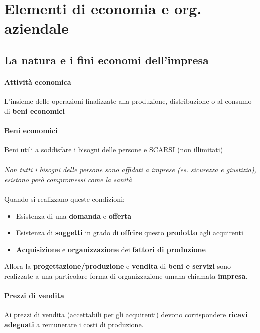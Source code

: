 \documentclass[12pt]{article}
\begin{document}
\section{Elementi di economia e org. aziendale}
\subsection{La natura e i fini economi dell'impresa}
\paragraph{Attività economica} L'insieme delle operazioni finalizzate alla produzione, distribuzione o al consumo di \textbf{beni economici}
\paragraph{Beni economici} Beni utili a soddisfare i bisogni delle persone e SCARSI (non illimitati)

\paragraph{}\textit{Non tutti i bisogni delle persone sono affidati a imprese (es. sicurezza e giustizia), esistono però compromessi come la sanità}

\paragraph{} Quando si realizzano queste condizioni:
\begin{itemize}
    \item Esistenza di una \textbf{domanda} e \textbf{offerta}
    \item Esistenza di \textbf{soggetti} in grado di \textbf{offrire} questo \textbf{prodotto} agli acquirenti
    \item \textbf{Acquisizione} e \textbf{organizzazione} dei \textbf{fattori di produzione}
\end{itemize}
Allora la \textbf{progettazione/produzione} e \textbf{vendita} di \textbf{beni e servizi} sono realizzate a una particolare forma di organizzazione umana chiamata \textbf{impresa}.

\paragraph{Prezzi di vendita} Ai prezzi di vendita (accettabili per gli acquirenti) devono corrispondere \textbf{ricavi adeguati} a remunerare i costi di produzione.
\end{document}
